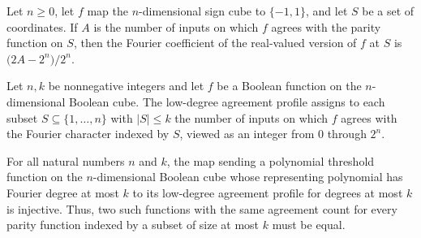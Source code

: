 \begin{theorem}
\label{FABL.fourierCoeff_eq_agreementCount}
\leanok
{}
Let $n\ge 0$, let $f$ map the $n$-dimensional sign cube to $\{-1,1\}$, and let $S$ be a
set of coordinates. If $A$ is the number of inputs on which $f$ agrees with the parity
function on $S$, then the Fourier coefficient of the real-valued version of $f$ at $S$
is $\bigl(2A-2^n\bigr)/2^n$.
\end{theorem}

\begin{definition}
\label{FABL.lowDegreeAgreementProfile}
\leanok
{}
Let $n,k$ be nonnegative integers and let $f$ be a Boolean function on the
$n$-dimensional Boolean cube. The low-degree agreement profile assigns to each subset
$S\subseteq\{1,\ldots,n\}$ with $|S|\le k$ the number of inputs on which $f$ agrees with
the Fourier character indexed by $S$, viewed as an integer from $0$ through $2^n$.
\end{definition}

\begin{theorem}
\label{FABL.lowDegreeAgreementProfile_injective_on_polynomialThreshold}
\leanok
{}
For all natural numbers $n$ and $k$, the map sending a polynomial threshold function on
the $n$-dimensional Boolean cube whose representing polynomial has Fourier degree at
most $k$ to its low-degree agreement profile for degrees at most $k$ is injective. Thus,
two such functions with the same agreement count for every parity function indexed by a
subset of size at most $k$ must be equal.
\end{theorem}

